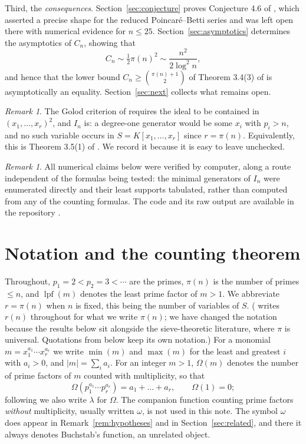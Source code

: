 \documentclass[a4paper,11pt,oneside,reqno]{amsart}
\theoremstyle{definition}
\theoremstyle{remark}
\newtheorem{remark}[definition]{Remark}
\theoremstyle{plain}
\newcommand{\lpf}{\operatorname{lpf}}
\newcommand{\Om}{\Omega}
\begin{document}
Third, the \emph{consequences}. Section~\ref{sec:conjecture} proves Conjecture
4.6 of \cite{Snellman2000}, which asserted a precise shape for the reduced
Poincaré--Betti series and was left open there with numerical evidence for
\(n \le 25\). Section~\ref{sec:asymptotics} determines the asymptotics of
\(C_n\), showing that
\[
  C_n \sim \tfrac{1}{2}\pi(n)^{2} \sim \frac{n^{2}}{2\log^{2}n},
\]
and hence that the lower bound \(C_n \ge \binom{\pi(n)+1}{2}\) of Theorem 3.4(3) of
\cite{Snellman2000} is asymptotically an equality. Section~\ref{sec:next}
collects what remains open.

\begin{remark}\label{rem:m2}
  The Golod criterion of \cite{AramovaHerzog,Peeva} requires the ideal to be
  contained in \((x_1,\dots,x_r)^{2}\), and \(I_n\) is: a degree-one
  generator would be some \(x_i\) with \(p_i > n\), and no such variable occurs
  in \(S = K[x_1,\dots,x_r]\) since \(r = \pi(n)\). Equivalently, this is Theorem
  3.5(1) of \cite{Snellman2000}. We record it because it is easy to leave unchecked.
\end{remark}

\begin{remark}
  All numerical claims below were verified by computer, along a route
  independent of the formulas being tested: the minimal generators of \(I_n\)
  were enumerated directly and their least supports tabulated, rather than
  computed from any of the counting formulas. The code and its raw output are
  available in the repository \cite{gitrepo}.
\end{remark}

\section{Notation and the counting theorem}\label{sec:prelim}

Throughout, \(p_1 = 2 < p_2 = 3 < \cdots\) are the primes, \(\pi(n)\) is the number of
primes \(\le n\), and \(\lpf(m)\) denotes the least prime factor of \(m > 1\).
We abbreviate \(r = \pi(n)\) when \(n\) is fixed, this being the number of
variables of \(S\). (\cite{Snellman2000} writes \(r(n)\) throughout for what we
write \(\pi(n)\); we have changed the notation because the results below sit
alongside the sieve-theoretic literature, where \(\pi\) is universal. Quotations
from \cite{Snellman2000} below keep its own notation.)
For a monomial \(m = x_1^{a_1}\cdots x_r^{a_r}\) we write \(\min(m)\) and
\(\max(m)\) for the least and greatest \(i\) with \(a_i > 0\), and
\(|m|=\sum_i a_i\). For an integer \(m > 1\), \(\Om(m)\) denotes the number of
prime factors of \(m\) counted with multiplicity, so that
\[
  \Om(p_1^{a_1}\cdots p_r^{a_r}) = a_1+\dots+a_r,\qquad \Om(1) = 0;
\]
following
\cite{Snellman2000} we also write \(\lambda\) for \(\Om\). The companion
function counting prime factors \emph{without} multiplicity, usually written
\(\omega\), is not used in this note. The symbol \(\omega\) does appear in
Remark~\ref{rem:hypotheses} and in Section~\ref{sec:related}, and there it
always denotes Buchstab's function, an unrelated object.
\end{document}
